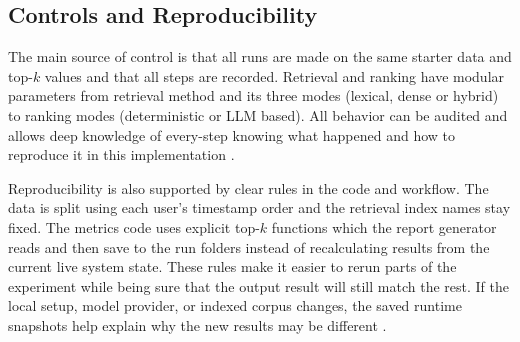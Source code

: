 \subsection{Controls and Reproducibility}

The main source of control is that all runs are made on the same starter data and top-$k$ values and that all steps are recorded. Retrieval and ranking have modular parameters from retrieval method and its three modes (lexical, dense or hybrid) to ranking modes (deterministic or LLM based). All behavior can be audited and allows deep knowledge of every-step knowing what happened and how to reproduce it in this implementation \cite{ragpoisonlab_repo}. 

Reproducibility is also supported by clear rules in the code and workflow. The data is split using each user’s timestamp order and the retrieval index names stay fixed. The metrics code uses explicit top-$k$ functions which the report generator reads and then save to the run folders instead of recalculating results from the current live system state. These rules make it easier to rerun parts of the experiment  while being sure that the output result will still match the rest. If the local setup, model provider, or indexed corpus changes, the saved runtime snapshots help explain why the new results may be different \cite{ragpoisonlab_repo}.
